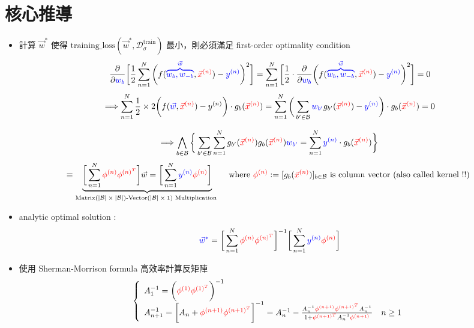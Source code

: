 \documentclass{article}
\begin{document}
\begin{CJK}{UTF8}{bsmi}
\begin{itemize}
\end{itemize}

\newpage 
\section{核心推導}
\begin{itemize}
\item 計算 $\vec{w}^{*}$ 使得  $\text{training\_loss$(\vec{w}^{*},\mathcal{D}^{\text{train}}_{\sigma})$}$ 最小，則必須滿足 first-order optimality condition 
$$  \frac{\partial}{\partial \color{blue}w_b} \bigg[ \frac{1}{2}  \sum_{n=1}^{N}   \bigg(f({\color{blue}\overbrace{w_b,w_{-b}}^{\vec{w}}},{\color{red}\vec{x}^{(n)}}) - {\color{blue}y^{(n)} }\bigg)^2 \bigg] =\sum_{n=1}^{N}\bigg[ \frac{1}{2} \cdot \frac{\partial}{\partial \color{blue}w_b}  \bigg(f({\color{blue}\overbrace{w_b,w_{-b}}^{\vec{w}}},{\color{red}\vec{x}^{(n)}}) - {\color{blue}y^{(n)} }\bigg)^2 \bigg] = 0 $$ $$\Longrightarrow \sum_{n=1}^{N} \frac{1}{2} \times 2\bigg( f({\color{blue}\vec{w}},{\color{red}\vec{x}^{(n)}}) - y^{(n)} \bigg)\cdot g_b({\color{red}\vec{x}^{(n)}}) = \sum_{n=1}^{N} \bigg( \sum_{b' \in \mathcal{B}} {\color{blue}w_{b'}} g_{b'}({\color{red}\vec{x}^{(n)}}) - {\color{blue} y^{(n)}} \bigg) \cdot g_{b}({\color{red}\vec{x}^{(n)}})   = 0 $$

$$ \Longrightarrow  \bigwedge_{b \in \mathcal{B}} \bigg\{ \sum_{b' \in \mathcal{B}}   \sum_{n=1}^{N}g_{b'}({\color{red}\vec{x}^{(n)}})g_{b}({\color{red}\vec{x}^{(n)}}) {\color{blue}w_{b'}} = \sum_{n=1}^{N}  {\color{blue}y^{(n)}} \cdot  g_{b}({\color{red}\vec{x}^{(n)}}) \bigg\} $$ $$ \equiv \underbrace{  \bigg[\sum_{n=1}^{N} {\color{red}\phi^{(n)}\phi^{(n)^T}} \bigg] \vec{w} = \bigg[\sum_{n=1}^{N} {\color{blue}y^{(n)}} {\color{red}\phi^{(n)}} \bigg]}_{\text{Matrix$(|\mathcal{B}| \times |\mathcal{B}|)$-Vector$(|\mathcal{B}| \times 1)$ Multiplication }} \quad \text{where } {\color{red}\phi^{(n)}} := [g_{b}({\color{red}\vec{x}^{(n)}})]_{b \in \mathcal{B}} \text{ is column vector (also called kernel !!) }   $$

\item analytic optimal solution :
$$ {\color{blue} \vec{w}^{*}} =   \bigg[\sum_{n=1}^{N} {\color{red}\phi^{(n)}\phi^{(n)^T}} \bigg]^{-1}\bigg[\sum_{n=1}^{N} {\color{blue}y^{(n)}} {\color{red}\phi^{(n)}} \bigg]   $$


\item 使用 Sherman-Morrison formula 高效率計算反矩陣
$$  \left\{\begin{array}{lc}   A_1^{-1} =  \bigg({\color{red} \phi^{(1)} \phi^{(1)^T}}\bigg)^{-1} &  \\ A_{n+1}^{-1} =  \bigg[ A_{n} +{\color{red} \phi^{(n+1)} \phi^{(n+1)^T}} \bigg]^{-1}  =  A_{n}^{-1} - \frac{A_{n}^{-1}{\color{red}\phi^{(n+1)} \phi^{(n+1)^T}} A_{n}^{-1}}{ 1+ {\color{red} \phi^{(n+1)^T}}  A_{n}^{-1} {\color{red}\phi^{(n+1)}}   } & n \geq 1  \end{array}\right.$$

\end{itemize}

\end{CJK}
\end{document}
